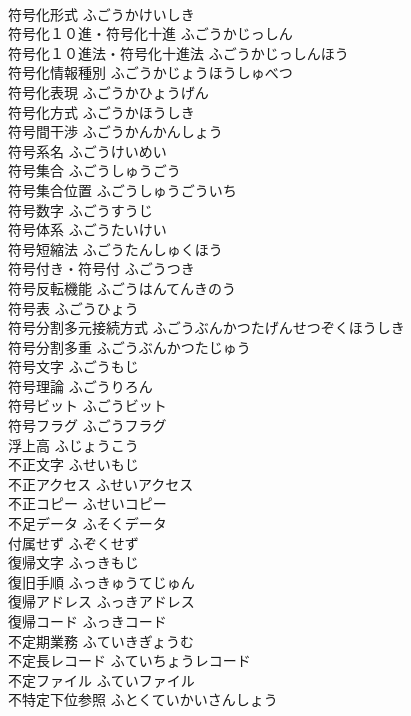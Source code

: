 \documentclass[8pt]{extreport}
\begin{document}
\begin{CJK}{UTF8}{min}
\\	符号化形式	ふごうかけいしき	
\\	符号化１０進・符号化十進	ふごうかじっしん	
\\	符号化１０進法・符号化十進法	ふごうかじっしんほう	
\\	符号化情報種別	ふごうかじょうほうしゅべつ	
\\	符号化表現	ふごうかひょうげん	
\\	符号化方式	ふごうかほうしき	
\\	符号間干渉	ふごうかんかんしょう	
\\	符号系名	ふごうけいめい	
\\	符号集合	ふごうしゅうごう	
\\	符号集合位置	ふごうしゅうごういち	
\\	符号数字	ふごうすうじ	
\\	符号体系	ふごうたいけい	
\\	符号短縮法	ふごうたんしゅくほう	
\\	符号付き・符号付	ふごうつき	
\\	符号反転機能	ふごうはんてんきのう	
\\	符号表	ふごうひょう	
\\	符号分割多元接続方式	ふごうぶんかつたげんせつぞくほうしき	
\\	符号分割多重	ふごうぶんかつたじゅう	
\\	符号文字	ふごうもじ	
\\	符号理論	ふごうりろん	
\\	符号ビット	ふごうビット	
\\	符号フラグ	ふごうフラグ	
\\	浮上高	ふじょうこう	
\\	不正文字	ふせいもじ	
\\	不正アクセス	ふせいアクセス	
\\	不正コピー	ふせいコピー	
\\	不足データ	ふそくデータ	
\\	付属せず	ふぞくせず	
\\	復帰文字	ふっきもじ	
\\	復旧手順	ふっきゅうてじゅん	
\\	復帰アドレス	ふっきアドレス	
\\	復帰コード	ふっきコード	
\\	不定期業務	ふていきぎょうむ	
\\	不定長レコード	ふていちょうレコード	
\\	不定ファイル	ふていファイル	
\\	不特定下位参照	ふとくていかいさんしょう	

\end{CJK}
\end{document}
